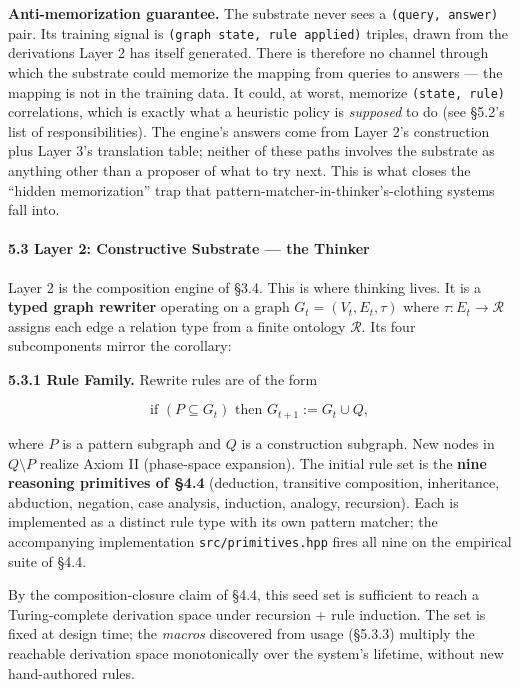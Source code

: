 \documentclass[
  11pt,
  a4paper,
]{article}
\begin{document}
\textbf{Anti-memorization guarantee.} The substrate never sees a
\texttt{(query,\ answer)} pair. Its training signal is
\texttt{(graph\ state,\ rule\ applied)} triples, drawn from the
derivations Layer 2 has itself generated. There is therefore no channel
through which the substrate could memorize the mapping from queries to
answers --- the mapping is not in the training data. It could, at worst,
memorize \texttt{(state,\ rule)} correlations, which is exactly what a
heuristic policy is \emph{supposed} to do (see §5.2's list of
responsibilities). The engine's answers come from Layer 2's construction
plus Layer 3's translation table; neither of these paths involves the
substrate as anything other than a proposer of what to try next. This is
what closes the ``hidden memorization'' trap that
pattern-matcher-in-thinker's-clothing systems fall into.

\paragraph{5.3 Layer 2: Constructive Substrate --- the
Thinker}\label{layer-2-constructive-substrate-the-thinker}

Layer 2 is the composition engine of §3.4. This is where thinking lives.
It is a \textbf{typed graph rewriter} operating on a graph
\(G_t = (V_t, E_t, \tau)\) where \(\tau: E_t \to \mathcal{R}\) assigns
each edge a relation type from a finite ontology \(\mathcal{R}\). Its
four subcomponents mirror the corollary:

\textbf{5.3.1 Rule Family.} Rewrite rules are of the form

\[
\text{if } (P \subseteq G_t) \text{ then } G_{t+1} := G_t \cup Q,
\]

where \(P\) is a pattern subgraph and \(Q\) is a construction subgraph.
New nodes in \(Q \setminus P\) realize Axiom II (phase-space expansion).
The initial rule set is the \textbf{nine reasoning primitives of §4.4}
(deduction, transitive composition, inheritance, abduction, negation,
case analysis, induction, analogy, recursion). Each is implemented as a
distinct rule type with its own pattern matcher; the accompanying
implementation \texttt{src/primitives.hpp} fires all nine on the
empirical suite of §4.4.

By the composition-closure claim of §4.4, this seed set is sufficient to
reach a Turing-complete derivation space under recursion + rule
induction. The set is fixed at design time; the \emph{macros} discovered
from usage (§5.3.3) multiply the reachable derivation space
monotonically over the system's lifetime, without new hand-authored
rules.
\end{document}
